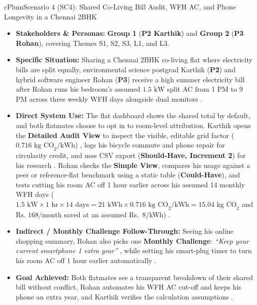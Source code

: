 \documentclass[12pt, a4paper]{article}
\begin{document}
\begin{scenariocard}{cPlum}{Scenario 4 (SC4): Shared Co-Living Bill Audit, WFH AC, and Phone Longevity in a Chennai 2BHK}
\begin{itemize}
    \item \textbf{Stakeholders \& Personas:} \textbf{Group 1} (\textbf{P2 Karthik}) and \textbf{Group 2} (\textbf{P3 Rohan}), covering Themes S1, S2, S3, L1, and L3.
    \item \textbf{Specific Situation:} Sharing a Chennai 2BHK co-living flat where electricity bills are split equally, environmental science postgrad Karthik (\textbf{P2}) and hybrid software engineer Rohan (\textbf{P3}) receive a high summer electricity bill after Rohan runs his bedroom's assumed $1.5\text{ kW}$ split AC from 1 PM to 9 PM across three weekly WFH days alongside dual monitors \cite{cf2, cf4, cf10}.
    \item \textbf{Direct System Use:} The flat dashboard shows the shared total by default, and both flatmates choose to opt in to room-level attribution. Karthik opens the \textbf{Detailed Audit View} to inspect the visible, editable grid factor ($0.716\text{ kg CO}_2/\text{kWh}$) \cite{cf4}, logs his bicycle commute and phone repair for circularity credit, and uses CSV export (\textbf{Should-Have, Increment 2}) for his research \cite{cf4}. Rohan checks the \textbf{Simple View}, compares his usage against a peer or reference-flat benchmark using a static table (\textbf{Could-Have}), and tests cutting his room AC off 1 hour earlier across his assumed 14 monthly WFH days ($1.5\text{ kW} \times 1\text{ hr} \times 14\text{ days} = 21\text{ kWh} \times 0.716\text{ kg CO}_2/\text{kWh} = 15.04\text{ kg CO}_2$ and $\text{Rs.\ } 168/\text{month}$ saved at an assumed Rs.\ 8/kWh) \cite{cf2}.
    \item \textbf{Indirect / Monthly Challenge Follow-Through:} Seeing his online shopping summary, Rohan also picks one \textbf{Monthly Challenge}: \textit{``Keep your current smartphone 1 extra year''} \cite{cf10}, while setting his smart-plug timer to turn his room AC off 1 hour earlier automatically \cite{cf2}.
    \item \textbf{Goal Achieved:} Both flatmates see a transparent breakdown of their shared bill without conflict, Rohan automates his WFH AC cut-off and keeps his phone an extra year, and Karthik verifies the calculation assumptions \cite{cf2, cf4, cf10}.
\end{itemize}
\end{scenariocard}
\end{document}
